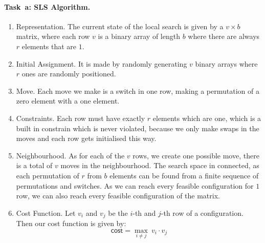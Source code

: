 \paragraph{Task~a: SLS Algorithm.}
\begin{enumerate}
\item Representation. 
The current state of the local search is given by a $v \times b$ matrix, where each row $v$ is a binary array of length $b$ where there are always $r$ elements that are $1$. 

  
\item Initial Assignment. It is made by randomly generating $v$ binary arrays where $r$ ones are randomly positioned. %
\item Move. Each move we make is a switch in one row, making a permutation of a zero element with a one element. 
\item Constraints. Each row must have exactly $r$ elements which are one, which is a built in constrain which is never violated, because we only make swaps in the moves and each row gets initialised this way. 
\item Neighbourhood. As for each of the $v$ rows, we create one possible move, there is a total of $v$ moves in the neighbourhood. The search space in connected, as each permutation of $r$ from $b$ elements can be found from a finite sequence of permutations and switches. As we can reach every feasible configuration for $1$ row, we can also reach every feasible configuration of the matrix. 
\item Cost Function. Let $v_i$ and $v_j$ be the $i$-th and $j$-th row of a configuration. Then our cost function is given by: 
\begin{equation*}
 \mathsf{cost} = \max_{i \neq j}\: v_i \cdot v_j 
\end{equation*}


\end{enumerate}
